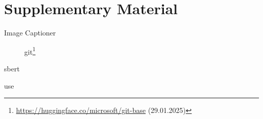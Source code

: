 \appendix
\section{Supplementary Material}

\begin{frame}{Image Captioner~\parencite{git_2022}}
    \label{supp:img_cap}
    \begin{figure}
        
        \caption{\ac{git}\footnote{\url{https://huggingface.co/microsoft/git-base} (29.01.2025)}}
    \end{figure}
\end{frame}

\begin{frame}{\ac{sbert}~\parencite{sbert_2019}}
    \label{supp:sbert}
    
\end{frame}

\begin{frame}{\ac{use}~\parencite{use_2019}}
    \label{supp:use}
    
\end{frame}